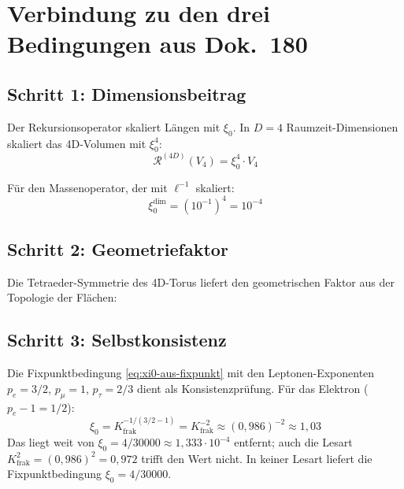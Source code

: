 \section{Verbindung zu den drei Bedingungen aus Dok.~180}

\subsection{Schritt 1: Dimensionsbeitrag}

Der Rekursionsoperator skaliert Längen mit $\xi_0$. In $D=4$
Raumzeit-Dimensionen skaliert das 4D-Volumen mit $\xi_0^4$:
\begin{equation}
  \mathcal{R}^{(4D)}(V_4) = \xi_0^4 \cdot V_4
\end{equation}

Für den Massenoperator, der mit $\ell^{-1}$ skaliert:
\begin{equation}
  \xi_0^{\text{dim}} = (10^{-1})^4 = 10^{-4}
\end{equation}

\subsection{Schritt 2: Geometriefaktor}

Die Tetraeder-Symmetrie des 4D-Torus liefert den geometrischen Faktor
aus der Topologie der Flächen:

\begin{center}
{\footnotesize
{}}
\end{center}

\subsection{Schritt 3: Selbstkonsistenz}

Die Fixpunktbedingung \eqref{eq:xi0-aus-fixpunkt} mit den Leptonen-Exponenten
$p_e = 3/2$, $p_\mu = 1$, $p_\tau = 2/3$ dient als Konsistenzprüfung.
Für das Elektron ($p_e - 1 = 1/2$):
\begin{equation}
  \xi_0 = K_{\text{frak}}^{-1/(3/2 - 1)}
  = K_{\text{frak}}^{-2}
  \approx (0{,}986)^{-2} \approx 1{,}03
\end{equation}
Das liegt weit von $\xi_0 = 4/30000 \approx 1{,}333 \cdot 10^{-4}$
entfernt; auch die Lesart $K_{\text{frak}}^2 = (0{,}986)^2 = 0{,}972$
trifft den Wert nicht. In keiner Lesart liefert die Fixpunktbedingung
$\xi_0 = 4/30000$.

